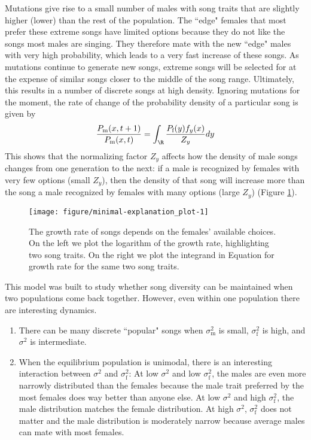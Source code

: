\documentclass{article}\usepackage[]{graphicx}\usepackage[]{color}
\makeatletter
\def\maxwidth{ %
  \ifdim\Gin@nat@width>\linewidth
    \linewidth
  \else
    \Gin@nat@width
  \fi
}
\newenvironment{knitrout}{}{} %
\makeatother
\begin{document}
Mutations give rise to a small number of males with song traits that are slightly higher (lower) than the rest of the population. The ``edge" females that most prefer these extreme songs have limited options because they do not like the songs most males are singing. They therefore mate with the new ``edge" males with very high probability, which leads to a very fast increase of these songs. As mutations continue to generate new songs, extreme songs will be selected for at the expense of similar songs closer to the middle of the song range. Ultimately, this results in a number of discrete songs at high density.
Ignoring mutations for the moment, the rate of change of the probability density of a particular song is given by 
\begin{equation}
\frac{P_\text{m}(x,t+1)}{P_\text{m}(x,t)}= \int _\R\frac{ P_\text{f}(y)f_y(x)}{Z_y}dy \label{growth}
\end{equation}
This shows that the normalizing factor $Z_y$ affects how the density of male songs changes from one generation to the next: if a male is recognized by females with very few options (small $Z_y$), then the density of that song will increase more than the song a male recognized by females with many options (large $Z_y$) (Figure \ref{fig:explanation_plot}).
\begin{knitrout}\footnotesize
{}\color{fgcolor}\begin{figure}
{\centering \texttt{[image: figure/minimal-explanation\_plot-1]} 
}
\caption[The growth rate of songs depends on the females' available choices]{The growth rate of songs depends on the females' available choices. On the left we plot the logarithm of the growth rate, highlighting two song traits. On the right we plot the integrand in Equation for growth rate for the same two song traits.}\label{fig:explanation_plot}
\end{figure}
\end{knitrout}
This model was built to study whether song diversity can be maintained when two populations come back together. However, even within one population there are interesting dynamics.
\begin{enumerate}
\item There can be many discrete ``popular" songs when $\sigma_\text{m}^2$  is small, $\sigma_\text{f}^2$ is high, and $\sigma^2$ is intermediate.
\item When the equilibrium population is unimodal, there is an interesting interaction between $\sigma^2$ and $\sigma_\text{f}^2$: At low $\sigma^2$ and low $\sigma_\text{f}^2$, the males are even more narrowly distributed than the females because the male trait preferred by the most females does way better than anyone else. At low $\sigma^2$ and high $\sigma_\text{f}^2$, the male distribution matches the female distribution. At high $\sigma^2$, $\sigma_\text{f}^2$ does not matter and the male distribution is moderately narrow because average males can mate with most females. 
\end{enumerate}


\end{document}
